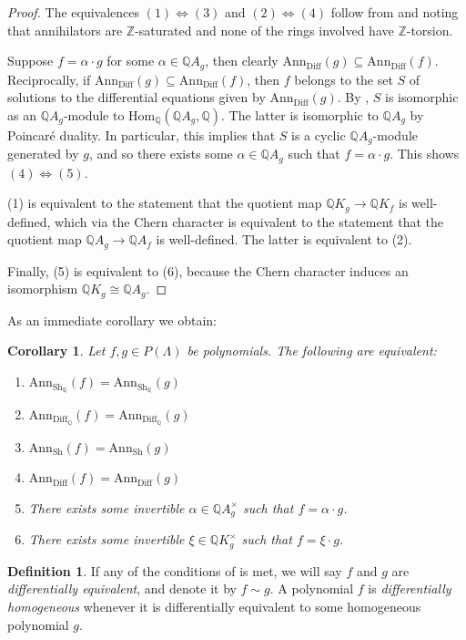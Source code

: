 \documentclass[oneside]{amsart}
\theoremstyle{plain}
\newtheorem{corollary}[theorem]{Corollary}
\theoremstyle{definition}
\newtheorem{definition}[theorem]{Definition}
\newcommand{\Z}{{\mathbb{Z}}}
\newcommand{\Q}{{\mathbb{Q}}}
\newcommand{\Ann}{{\mathrm{Ann}}}
\newcommand{\Diff}{{\mathrm{Diff}}}
\newcommand{\Hom}{{\mathrm{Hom}}}
\newcommand{\Sh}{{\mathrm{Sh}}}
\begin{document}
\begin{proof}
    The equivalences $(1) \iff (3)$ and $(2) \iff (4)$ follow from  and  noting that annihilators are $\Z$-saturated and none of the rings involved have $\Z$-torsion.

    Suppose $f = \alpha \cdot g$ for some $\alpha \in \Q A_g$, then clearly $\Ann_\Diff(g) \subseteq \Ann_\Diff(f)$.
    Reciprocally, if $\Ann_\Diff(g) \subseteq \Ann_\Diff(f)$, then $f$ belongs to the set $S$ of solutions to the differential equations given by $\Ann_\Diff(g)$. By , $S$ is isomorphic as an $\Q A_g$-module to $\Hom_\Q (\Q A_g, \Q)$. The latter is isomorphic to $\Q A_g$ by Poincar\'e duality. In particular, this implies that $S$ is a cyclic $\Q A_g$-module generated by $g$, and so there exists some $\alpha \in \Q A_g$ such that $f = \alpha \cdot g$. This shows $(4) \iff (5)$.

    (1) is equivalent to the statement that the quotient map $\Q K_g \to \Q K_f$ is well-defined, which via the Chern character is equivalent to the statement that the quotient map $\Q A_g \to \Q A_f$ is well-defined. The latter is equivalent to (2).

    Finally, (5) is equivalent to (6), because the Chern character induces an isomorphism $\Q K_g \cong \Q A_g$.
\end{proof}

As an immediate corollary we obtain:
\begin{corollary} \label{cor:polynomial-equivalence}
    Let $f, g \in P(\Lambda)$ be polynomials.
    The following are equivalent:
    \begin{enumerate}
        \item $\Ann_{\Sh_\Q}(f) = \Ann_{\Sh_\Q}(g)$
        \item $\Ann_{\Diff_\Q}(f) = \Ann_{\Diff_\Q}(g)$
        \item $\Ann_{\Sh}(f) = \Ann_{\Sh}(g)$
        \item $\Ann_{\Diff}(f) = \Ann_{\Diff}(g)$
        \item There exists some invertible $\alpha \in \Q A_g^\times$ such that $f = \alpha \cdot g$.
        \item There exists some invertible $\xi \in \Q K_g^\times$ such that $f = \xi \cdot g$.
    \end{enumerate}
\end{corollary}

\begin{definition}
    If any of the conditions of  is met, we will say $f$ and $g$ are \emph{differentially equivalent},
    and denote it by $f \sim g$.
    A polynomial $f$ is \emph{differentially homogeneous} whenever it is differentially equivalent to some homogeneous polynomial $g$.
\end{definition}
\end{document}
